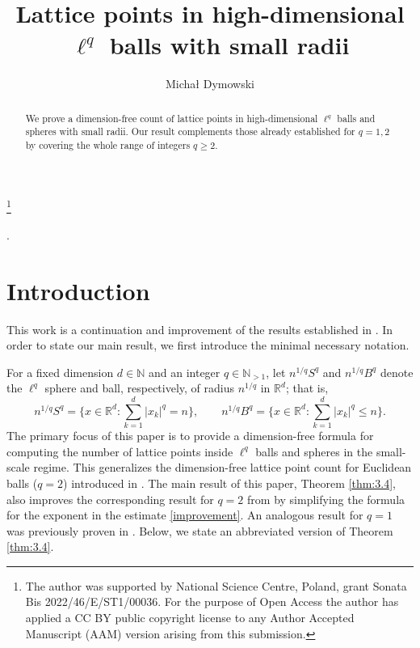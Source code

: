 \documentclass[a4paper,twoside, reqno]{amsart}
\numberwithin{equation}{section}
\theoremstyle{definition}%
\theoremstyle{definition}
\theoremstyle{definition}%
\theoremstyle{definition}
\newcommand{\N}{\mathbb{N}}
\newcommand{\R}{\mathbb{R}}
\begin{document}

 

\title{Lattice points in high-dimensional $\ell^q$ balls with small radii}

\begin{abstract}
We prove a dimension-free count of lattice points in high-dimensional $\ell^q$ balls and spheres with small radii. Our result complements those already established for $q=1,2$ by covering the whole range of integers $q\ge 2$. 
\end{abstract}

\thanks{The author was supported by National Science Centre, Poland, grant Sonata Bis 2022/46/E/ST1/00036.
For the purpose of Open Access the author has applied a CC BY
public copyright license to any Author Accepted Manuscript (AAM) version arising from
this submission.}

\author{Michał Dymowski}

\maketitle

.

\section{Introduction}
This work is a continuation and improvement of the results established in \cite{l2_balls}. In order to state our main result, we first introduce the minimal necessary notation.

For a fixed dimension $d\in\N$ and an integer $q\in\N_{>1}$, let $n^{1/q}S^q$ and $n^{1/q}B^q$ denote the $\ell^q$ sphere and ball, respectively, of radius $n^{1/q}$ in $\R^d$; that is,
\[
n^{1/q}S^q = \Big\{x\in\R^d : \sum_{k=1}^d |x_k|^q = n\Big\},\qquad n^{1/q}B^q = \Big\{x\in\R^d : \sum_{k=1}^d |x_k|^q \leq n\Big\}. 
\]
The primary focus of this paper is to provide a dimension-free formula for computing the number of lattice points inside $\ell^q$ balls and spheres in the small-scale regime. This generalizes the dimension-free lattice point count for Euclidean balls ($q=2$) introduced in \cite[Theorem 3.4]{l2_balls}. The main result of this paper, Theorem \ref{thm:3.4}, also improves the corresponding result for $q=2$ from \cite{l2_balls} by simplifying the formula for the exponent in the estimate \eqref{improvement}. An analogous result for $q=1$ was previously proven in \cite[Theorem 1.4]{l1_balls}. Below, we state an abbreviated version of Theorem \ref{thm:3.4}.
\end{document}
